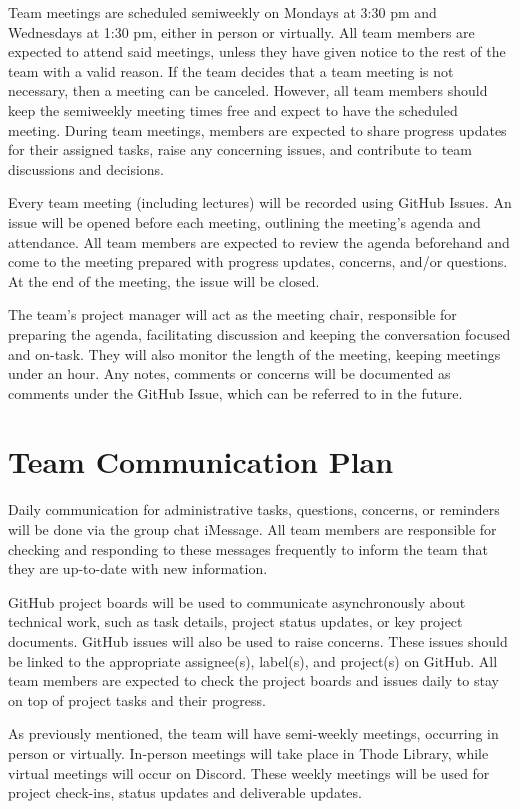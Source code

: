 \documentclass{article}
\begin{document}
	Team meetings are scheduled semiweekly on Mondays at 3:30 pm and Wednesdays at 1:30 pm, either in person or virtually. All team members are expected to attend said meetings, unless they have given notice to the rest of the team with a valid reason. If the team decides that a team meeting is not necessary, then a meeting can be canceled. However, all team members should keep the semiweekly meeting times free and expect to have the scheduled meeting. During team meetings, members are expected to share progress updates for their assigned tasks, raise any concerning issues, and contribute to team discussions and decisions.

	Every team meeting (including lectures) will be recorded using GitHub Issues. An issue will be opened before each meeting, outlining the meeting’s agenda and attendance. All team members are expected to review the agenda beforehand and come to the meeting prepared with progress updates, concerns, and/or questions. At the end of the meeting, the issue will be closed.

	The team’s project manager will act as the meeting chair, responsible for preparing the agenda, facilitating discussion and keeping the conversation focused and on-task. They will also monitor the length of the meeting, keeping meetings under an hour. Any notes, comments or concerns will be documented as comments under the GitHub Issue, which can be referred to in the future.

	\section{Team Communication Plan}

	Daily communication for administrative tasks, questions, concerns, or reminders will be done via the group chat iMessage. All team members are responsible for checking and responding to these messages frequently to inform the team that they are up-to-date with new information.

	GitHub project boards will be used to communicate asynchronously about technical work, such as task details, project status updates, or key project documents. GitHub issues will also be used to raise concerns. These issues should be linked to the appropriate assignee(s), label(s), and project(s) on GitHub. All team members are expected to check the project boards and issues daily to stay on top of project tasks and their progress.

	As previously mentioned, the team will have semi-weekly meetings, occurring in person or virtually. In-person meetings will take place in Thode Library, while virtual meetings will occur on Discord. These weekly meetings will be used for project check-ins, status updates and deliverable updates.
\end{document}
